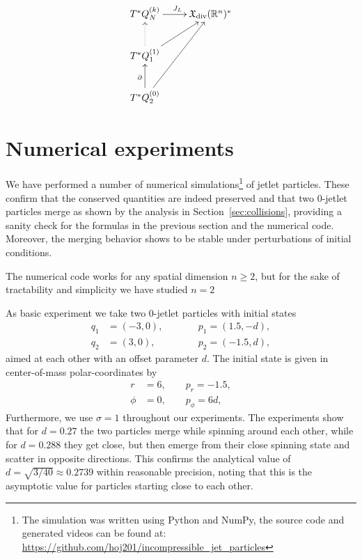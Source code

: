 \documentclass[12pt]{amsart}
\newcommand{\R}{\ensuremath{\mathbb{R}}}
\begin{document}
\begin{equation} \label{eq:embedding}
   \xymatrix{
     T^*Q_N^{(k)} \ar[r]^{J_L} & \mathfrak{X}_{\rm div}(\R^n)^* \\
     T^*Q_1^{(1)} \ar[ur] \ar@{.>}[u] \\
     T^*Q_2^{(0)} \ar[uur] \ar[u]^{\partial}
   }
\end{equation}


\section{Numerical experiments}
\label{sec:Numerical experiments}

We have performed a number of numerical simulations\footnote{%
  The simulation was written using Python and NumPy, the source code
  and generated videos can be found at:
  \url{https://github.com/hoj201/incompressible_jet_particles}%
} of jetlet particles. These confirm that the conserved
quantities are indeed preserved and that two $0$-jetlet particles
merge as shown by the analysis in Section~\ref{sec:collisions},
providing a sanity check for the formulas in the previous section and
the numerical code. Moreover, the merging behavior shows to be stable
under perturbations of initial conditions.

The numerical code works for any spatial dimension $n \ge 2$, but for
the sake of tractability and simplicity we have studied $n = 2$ 

As basic experiment we take two $0$-jetlet particles with initial
states
\begin{equation}\label{eq:exp1-initial}
  \begin{alignedat}{2}
    q_1 &= (-3, 0), &\qquad& p_1 = ( 1.5,-d), \\
    q_2 &= ( 3, 0), &      & p_2 = (-1.5, d),
  \end{alignedat}
\end{equation}
aimed at each other with an offset parameter $d$.
The initial state is given in center-of-mass polar-coordinates by
\begin{align*}
    r &= 6, \qquad p_r = -1.5, \\
    \phi &= 0,\qquad        p_\phi = 6d,
\end{align*}
Furthermore, we use
$\sigma = 1$ throughout our experiments. The experiments show that for
$d = 0.27$ the two particles merge while spinning around each other,
while for $d = 0.288$ they get close, but then emerge from their close
spinning state and scatter in opposite directions. This confirms the
analytical value of $d = \sqrt{3/40} \approx 0.2739$ within reasonable
precision, noting that this is the asymptotic value for particles
starting close to each other.
\end{document}
